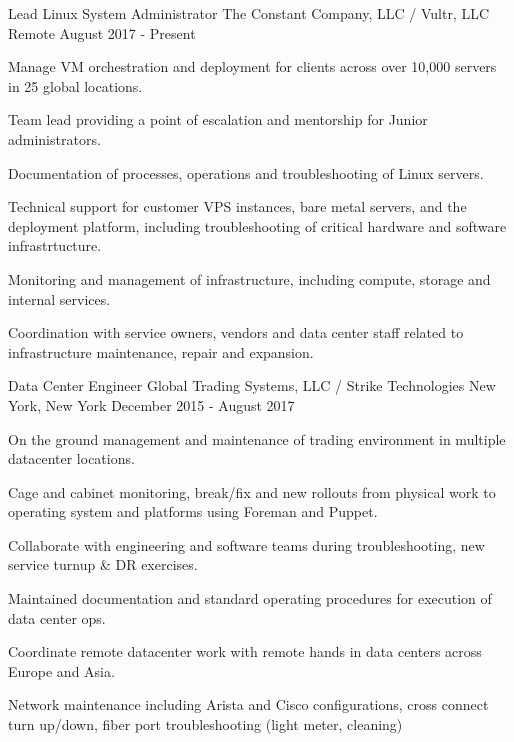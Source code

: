 
\begin{cventries}

	\cventry
	{Lead Linux System Administrator}
	{The Constant Company, LLC / Vultr, LLC}
	{Remote}
	{August 2017 - Present}
	{
		\begin{cvitems}
		\item {Manage VM orchestration and deployment for clients across over 10,000 servers in 25 global locations.}
		\item {Team lead providing a point of escalation and mentorship for Junior administrators.}
		\item {Documentation of processes, operations and troubleshooting of Linux servers.}
		\item {Technical support for customer VPS instances, bare metal servers, and the deployment platform, including troubleshooting of critical hardware and software infrastrtucture.}
		\item {Monitoring and management of infrastructure, including compute, storage and internal services.}
		\item {Coordination with service owners, vendors and data center staff related to infrastructure maintenance, repair and expansion.}
		\end{cvitems}
	}


	\cventry
	{Data Center Engineer}
	{Global Trading Systems, LLC / Strike Technologies}
	{New York, New York}
	{December 2015 - August 2017}
	{
		\begin{cvitems}
		\item {On the ground management and maintenance of trading environment in multiple datacenter locations.}
		\item {Cage and cabinet monitoring, break/fix and new rollouts from physical work to operating system and platforms using Foreman and Puppet.}
		\item {Collaborate with engineering and software teams during troubleshooting, new service turnup & DR exercises.}
		\item {Maintained documentation and standard operating procedures for execution of data center ops.}
		\item {Coordinate remote datacenter work with remote hands in data centers across Europe and Asia.}
		\item {Network maintenance including Arista and Cisco configurations, cross connect turn up/down, fiber port troubleshooting (light meter, cleaning)}
		\end{cvitems}
	}


\end{cventries}
